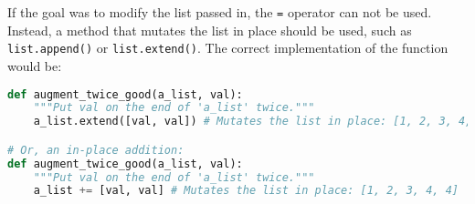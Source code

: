 If the goal was to modify the list passed in, the \texttt{=} operator can not be used. Instead, a method that mutates the list in place should be used, such as \texttt{list.append()} or \texttt{list.extend()}. The correct implementation of the function would be:

\begin{lstlisting}[language=Python, caption={Correct implementation of augment\_twice\_good}, label={lst:python-augment-twice-good}]
def augment_twice_good(a_list, val):
    """Put val on the end of 'a_list' twice."""
    a_list.extend([val, val]) # Mutates the list in place: [1, 2, 3, 4, 4]

# Or, an in-place addition:
def augment_twice_good(a_list, val):
    """Put val on the end of 'a_list' twice."""
    a_list += [val, val] # Mutates the list in place: [1, 2, 3, 4, 4]

\end{lstlisting}